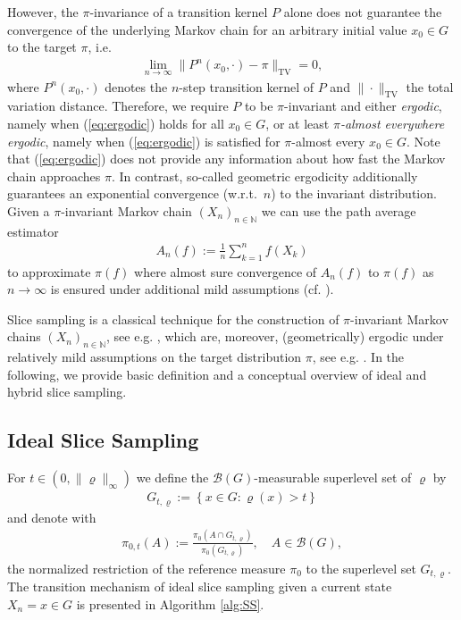 \documentclass[sn-mathphys-num]{sn-jnl}%
\theoremstyle{thmstyleone}%
\theoremstyle{thmstyletwo}%
\theoremstyle{thmstylethree}%
\newcommand{\change}[1]{\bgroup\color{black}#1\egroup}    %
\begin{document}
\noindent However, the $\pi$-invariance of a transition kernel $P$ alone does not guarantee the convergence of the underlying Markov chain for an arbitrary initial value $x_0 \in G$ to the target $\pi$, i.e.
 \begin{align}\label{eq:ergodic}
        \lim_{n \to \infty} 
        \| P^n(x_0,\cdot) - \pi  \|_{\mathrm{TV}} = 0,
  \end{align}
where $P^n(x_0, \cdot)$ denotes the $n$-step transition kernel of $P$ and $\| \cdot \|_{\mathrm{TV}}$ the total variation distance. Therefore, we require $P$ to be $\pi$-invariant and either \emph{ergodic}, namely when (\ref{eq:ergodic}) holds for all $x_0 \in G$, or at least \emph{$\pi$-almost everywhere ergodic}, namely when (\ref{eq:ergodic}) is satisfied for $\pi$-almost every $x_0 \in G$. \change{Note that (\ref{eq:ergodic}) does not provide any information about how fast the Markov chain approaches $\pi$. In contrast, so-called geometric ergodicity additionally guarantees an exponential convergence (w.r.t.~$n$) to the invariant distribution.} %
Given a %
$\pi$-invariant Markov chain $(X_n)_{n\in\mathbb{N}}$ we can use the path average estimator 
\begin{align}\label{path}
A_n(f) := \frac 1n \sum_{k=1}^n f(X_k)
\end{align}
to approximate $\pi(f)$ where almost sure convergence of $A_n(f)$ to $\pi(f)$ as $n\to\infty$ is ensured under additional mild assumptions (cf. \cite[Theorem 3]{Tierney1994}).

Slice sampling is a classical technique for the construction of $\pi$-invariant Markov chains $(X_n)_{n\in\mathbb{N}}$, see e.g. \cite{besag1993spatial,Neal2003}, which are, moreover, (geometrically) ergodic under relatively mild assumptions on the target distribution $\pi$, see e.g. \cite{RobertsRosenthal1999,MiraTierney2002}.
In the following, we provide basic definition and a \change{conceptual} overview of ideal and hybrid slice sampling. 


\subsection{Ideal Slice Sampling}
For $t \in (0, \|\varrho\|_\infty)$
we define the $\mathcal{B}(G)$-measurable superlevel set of $\varrho$ by
\begin{align}\label{PMLR:levelset}
	G_{t,\varrho}:=\left\{x\in G \colon \varrho(x) > t\right\}	
\end{align}
and denote with
\begin{align*}
	\pi_{0,t}(A):=\frac{\pi_0(A \cap G_{t,\varrho})}{\pi_0(G_{t,\varrho})}, \quad A\in\mathcal{B}(G),
\end{align*}
the normalized restriction of the reference measure $\pi_{0}$ to the superlevel set $G_{t,\varrho}$. The transition mechanism of ideal slice sampling given a current state $X_n = x\in G$ is presented in Algorithm \ref{alg:SS}.
\end{document}
